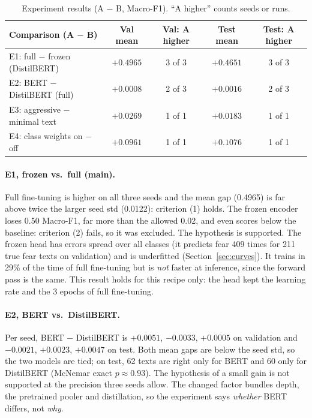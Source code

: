 \documentclass[11pt,a4paper]{article}
\begin{document}
\begin{table}[H]
\centering
\caption{Experiment results (A $-$ B, Macro-F1). ``A higher'' counts seeds or runs.}
\label{tab:exp}
\small\setlength{\tabcolsep}{4pt}
\begin{tabular}{@{}lcccc@{}}
\toprule
\textbf{Comparison (A $-$ B)} & \textbf{Val mean} & \textbf{Val: A higher} & \textbf{Test mean} & \textbf{Test: A higher}\\
\midrule
E1: full $-$ frozen (DistilBERT) & $+0.4965$ & 3 of 3 & $+0.4651$ & 3 of 3\\
E2: BERT $-$ DistilBERT (full) & $+0.0008$ & 2 of 3 & $+0.0016$ & 2 of 3\\
E3: aggressive $-$ minimal text & $+0.0269$ & 1 of 1 & $+0.0183$ & 1 of 1\\
E4: class weights on $-$ off & $+0.0961$ & 1 of 1 & $+0.1076$ & 1 of 1\\
\bottomrule
\end{tabular}
\end{table}

\paragraph{E1, frozen vs.\ full (main).} Full fine-tuning is higher on all three seeds and the mean gap (0.4965) is far above twice the larger seed std (0.0122): criterion (1) holds. The frozen encoder loses 0.50 Macro-F1, far more than the allowed 0.02, and even scores below the baseline: criterion (2) fails, so it was excluded. The hypothesis is supported. The frozen head has errors spread over all classes (it predicts fear 409 times for 211 true fear texts on validation) and is underfitted (Section~\ref{sec:curves}). It trains in 29\% of the time of full fine-tuning but is \emph{not} faster at inference, since the forward pass is the same. This result holds for this recipe only: the head kept the learning rate and the 3 epochs of full fine-tuning.

\paragraph{E2, BERT vs.\ DistilBERT.} Per seed, BERT $-$ DistilBERT is $+0.0051$, $-0.0033$, $+0.0005$ on validation and $-0.0021$, $+0.0023$, $+0.0047$ on test. Both mean gaps are below the seed std, so the two models are tied; on test, 62 texts are right only for BERT and 60 only for DistilBERT (McNemar exact $p\approx0.93$). The hypothesis of a small gain is not supported at the precision three seeds allow. The changed factor bundles depth, the pretrained pooler and distillation, so the experiment says \emph{whether} BERT differs, not \emph{why}.
\end{document}
